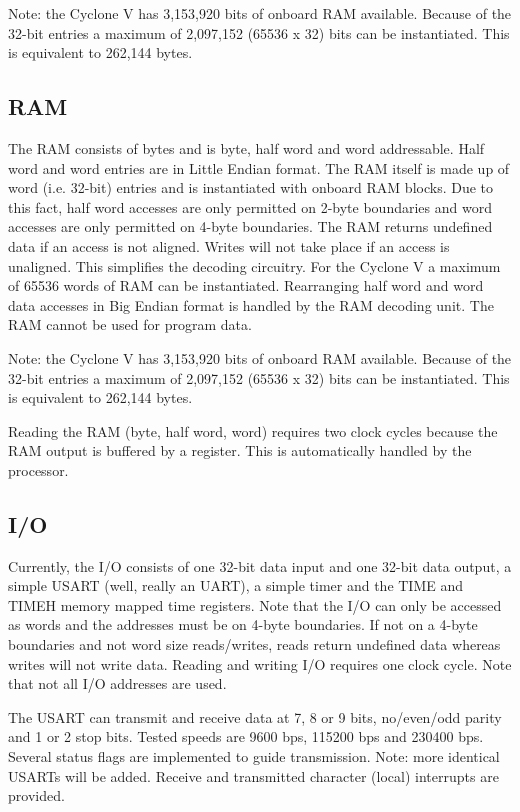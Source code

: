 \documentclass[12pt]{article}
\begin{document}
Note: the Cyclone V has 3,153,920 bits of onboard RAM available. Because of the 32-bit entries a maximum of 2,097,152 (65536 x 32) bits can be instantiated. This is equivalent to 262,144 bytes.

\subsection{RAM}
\label{sec:ram}
The RAM consists of bytes and is byte, half word and word addressable. Half word and word entries are in Little Endian format. The RAM itself is made up of word (i.e. 32-bit) entries and is instantiated with onboard RAM blocks. Due to this fact, half word accesses are only permitted on 2-byte boundaries and word accesses are only permitted on 4-byte boundaries. The RAM returns undefined data if an access is not aligned. Writes will not take place if an access is unaligned. This simplifies the decoding circuitry. For the Cyclone V a maximum of 65536 words of RAM can be instantiated. Rearranging half word and word data accesses in Big Endian format is handled by the RAM decoding unit. The RAM cannot be used for program data.

Note: the Cyclone V has 3,153,920 bits of onboard RAM available. Because of the 32-bit entries a maximum of 2,097,152 (65536 x 32) bits can be instantiated. This is equivalent to 262,144 bytes.

Reading the RAM (byte, half word, word) requires two clock cycles because the RAM output is buffered by a register. This is automatically handled by the processor.

\subsection{I/O}
\label{sec/io}
Currently, the I/O consists of one 32-bit data input and one 32-bit data output, a simple USART (well, really an UART), a simple timer and the TIME and TIMEH memory mapped time registers. Note that the I/O can only be accessed as words and the addresses must be on 4-byte boundaries. If not on a 4-byte boundaries and not word size reads/writes, reads return undefined data whereas writes will not write data. Reading and writing I/O requires one clock cycle. Note that not all I/O addresses are used.

The USART can transmit and receive data at 7, 8 or 9 bits, no/even/odd parity and 1 or 2 stop bits. Tested speeds are 9600 bps, 115200 bps and 230400 bps. Several status flags are implemented to guide transmission. Note: more identical USARTs will be added. Receive and transmitted character (local) interrupts are provided.
\end{document}
